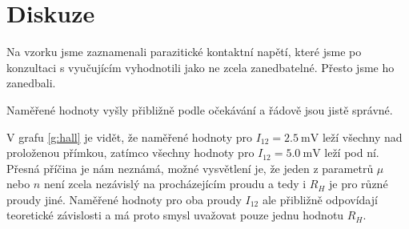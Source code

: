 \section*{Diskuze}
Na vzorku jsme zaznamenali parazitické kontaktní napětí, které jsme po konzultaci s vyučujícím vyhodnotili jako ne zcela zanedbatelné. Přesto jsme ho zanedbali.

Naměřené hodnoty vyšly přibližně podle očekávání a řádově jsou jistě správné.

V grafu \ref{g:hall} je vidět, že naměřené hodnoty pro $I_{12}=\SI{2.5}{\milli\volt}$ leží všechny nad proloženou přímkou, zatímco všechny hodnoty pro $I_{12}=\SI{5.0}{\milli\volt}$ leží pod ní.
Přesná příčina je nám neznámá, možné vysvětlení je, že jeden z parametrů $\mu$ nebo $n$ není zcela nezávislý na procházejícím proudu a tedy i $R_H$ je pro různé proudy jiné.
Naměřené hodnoty pro oba proudy $I_{12}$ ale přibližně odpovídají teoretické závislosti a má proto smysl uvažovat pouze jednu hodnotu $R_H$.